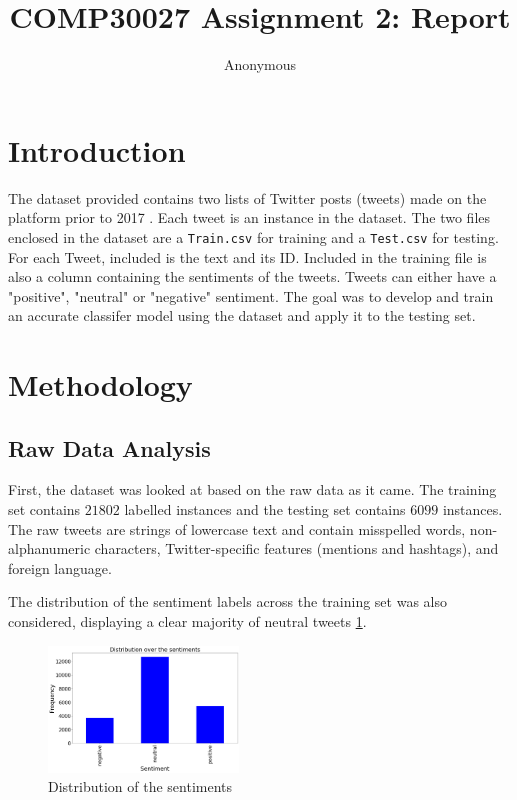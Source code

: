 \documentclass[11pt]{article}
\title{COMP30027 Assignment 2: Report}
\author
{Anonymous}
\begin{document}
\maketitle

\section{Introduction}

The dataset provided contains two lists of {T}witter posts (tweets) made on the platform prior to 2017 \cite{dataset}.
Each tweet is an instance in the dataset.
The two files enclosed in the dataset are a \texttt{Train.csv} for training and a \texttt{Test.csv} for testing. 
For each Tweet, included is the text and its ID. 
Included in the training file is also a column containing the sentiments of the tweets. 
Tweets can either have a "positive", "neutral" or "negative" sentiment.
The goal was to develop and train an accurate classifer model using the dataset and apply it to the testing set.

\section{Methodology}

\subsection{Raw Data Analysis}
First, the dataset was looked at based on the raw data as it came.
The training set contains $21802$ labelled instances and the testing set contains $6099$ instances. 
The raw tweets are strings of lowercase text and contain misspelled words, non-alphanumeric characters, Twitter-specific features (mentions and hashtags), and foreign language.

The distribution of the sentiment labels across the training set was also considered, 
displaying a clear majority of neutral tweets \ref{fig:sent-dist}.

\begin{figure}[!h]
	\centering
	\includegraphics[width = 0.45\textwidth]{sentiment-distribution.png}
	\caption{Distribution of the sentiments}
	\label{fig:sent-dist}
\end{figure} 
\end{document}
